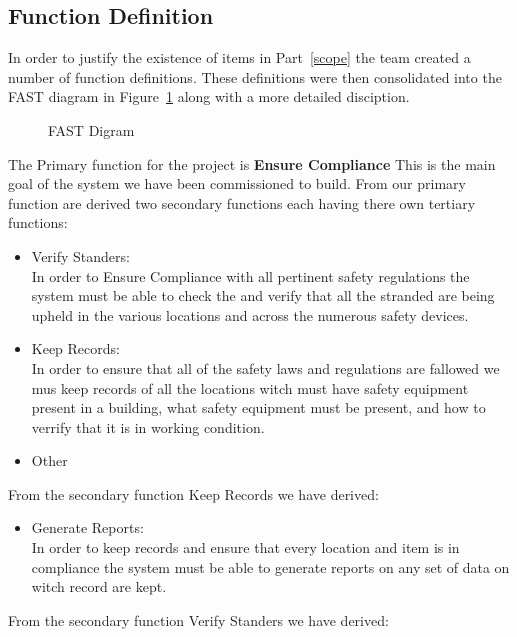 \documentclass[Letter,11pt]{article}
\begin{document}
	\subsection{Function Definition} 
		In order to justify the existence of items in Part~\ref{scope} the team created a number of function definitions. These definitions were then consolidated into the FAST diagram in Figure~\ref{fast1} along with a more detailed disciption.
		\begin{figure}[h]
			\centering
			
			\caption{\label{fast1} FAST Digram}
		\end{figure}
		The Primary function for the project is \textbf{Ensure Compliance} This is the main goal of the system we have been commissioned to build. From our primary function are derived two secondary functions each having there own tertiary functions:  
		\begin{itemize}
			\item Verify Standers:\\
			In order to Ensure Compliance with all pertinent safety regulations the system must be able to check the and verify that all the stranded are being upheld in the various locations and across the numerous safety devices.
			\item Keep Records:\\
			In order to ensure that all of the safety laws and regulations are fallowed we mus keep records of all the locations witch must have safety equipment present in a building, what safety equipment must be present, and how to verrify that it is in working condition.  

			\item Other 
		\end{itemize}
		From the secondary function Keep Records we have derived: 
		\begin{itemize}
			\item Generate Reports:\\
			In order to keep records and ensure that every location and item is in compliance the system must be able to generate reports on any set of data on witch record are kept. 
		\end{itemize}
		From the secondary function Verify Standers we have derived:
\end{document}
